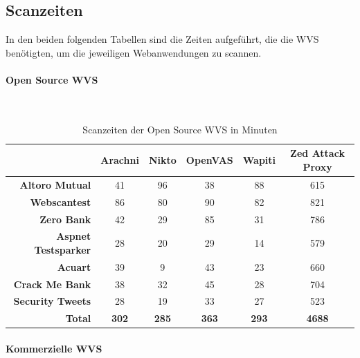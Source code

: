 \documentclass[12pt,oneside,a4paper,parskip]{scrbook}
\begin{document}
     \subsection{Scanzeiten}
     In den beiden folgenden Tabellen sind die Zeiten aufgeführt, die die WVS benötigten, um die jeweiligen Webanwendungen zu scannen.
     \paragraph{Open Source WVS}
     \
\begin{table}[H]
\begin{tabular}{|r|c|c|c|c|c|}
\hline
                            & \textbf{Arachni} & \textbf{Nikto} & \textbf{OpenVAS} & \textbf{Wapiti} & \textbf{Zed Attack Proxy}  \\
\hline
\textbf{Altoro Mutual}      & 41               & 96             & 38               & 88              & 615                        \\
\hline
\textbf{Webscantest}        & 86               & 80             & 90               & 82              & 821                        \\
\hline
\textbf{Zero Bank}          & 42               & 29             & 85               & 31              & 786                        \\
\hline
\textbf{Aspnet Testsparker} & 28               & 20             & 29               & 14              & 579                        \\
\hline
\textbf{Acuart}             & 39               & 9              & 43               & 23              & 660                        \\
\hline
\textbf{Crack Me Bank}      & 38               & 32             & 45               & 28              & 704                        \\
\hline
\textbf{Security Tweets}    & 28               & 19             & 33               & 27              & 523                        \\
\hline
\textbf{Total}              & \textbf{302}     & \textbf{285}   & \textbf{363}     & \textbf{293}    & \textbf{4688}              \\
\hline
\end{tabular}
\caption[Scanzeiten der Open Source WVS in Minuten]{Scanzeiten der Open Source WVS in Minuten}
\end{table}
\paragraph{Kommerzielle WVS}
\
\end{document}
